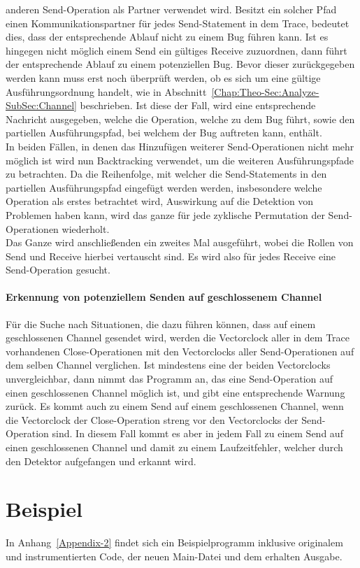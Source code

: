 anderen Send-Operation als Partner verwendet wird. Besitzt ein solcher Pfad 
einen Kommunikationspartner für jedes Send-Statement in dem Trace, bedeutet dies, 
dass der entsprechende Ablauf nicht zu einem Bug führen kann. Ist es hingegen 
nicht möglich einem Send ein gültiges Receive zuzuordnen, dann führt der 
entsprechende Ablauf zu einem potenziellen Bug. Bevor dieser zurückgegeben 
werden kann muss erst noch überprüft werden, ob es sich um eine 
gültige Ausführungsordnung handelt, wie in Abschnitt~\ref{Chap:Theo-Sec:Analyze-SubSec:Channel} 
beschrieben. Ist diese der Fall, wird eine entsprechende Nachricht ausgegeben, 
welche die Operation, welche zu dem Bug führt, sowie den partiellen
Ausführungspfad, bei welchem der Bug auftreten kann, enthält.\\In beiden 
Fällen, in denen das Hinzufügen weiterer Send-Operationen nicht mehr möglich ist 
wird nun Backtracking verwendet, um die weiteren Ausführungspfade zu betrachten.
Da die Reihenfolge, mit welcher die Send-Statements in den partiellen 
Ausführungspfad eingefügt werden werden, insbesondere welche Operation als erstes 
betrachtet wird, Auswirkung auf die Detektion von Problemen haben kann, 
wird das ganze für jede zyklische Permutation der Send-Operationen wiederholt. \\
Das Ganze wird anschließenden ein zweites Mal ausgeführt, wobei die Rollen 
von Send und Receive hierbei vertauscht sind. Es wird also für jedes Receive 
eine Send-Operation gesucht. 

\paragraph{Erkennung von potenziellem Senden auf geschlossenem Channel}
Für die Suche nach Situationen, die dazu führen können, dass auf einem 
geschlossenen Channel gesendet wird, werden die Vectorclock aller in dem 
Trace vorhandenen Close-Operationen mit den Vectorclocks aller Send-Operationen
auf dem selben Channel verglichen. Ist mindestens eine der beiden Vectorclocks 
unvergleichbar, dann nimmt das Programm an, das eine Send-Operation auf 
einen geschlossenen Channel möglich ist, und gibt eine entsprechende 
Warnung zurück. Es kommt auch zu einem Send auf einem geschlossenen Channel, 
wenn die Vectorclock der Close-Operation streng vor den Vectorclocks 
der Send-Operation sind. In diesem Fall kommt es aber in jedem Fall zu einem 
Send auf einen geschlossenen Channel und damit zu einem Laufzeitfehler, 
welcher durch den Detektor aufgefangen und erkannt wird.


\section{Beispiel}
In Anhang~\ref{Appendix-2} findet sich ein Beispielprogramm inklusive
originalem und instrumentierten Code, der neuen Main-Datei und
dem erhalten Ausgabe. 